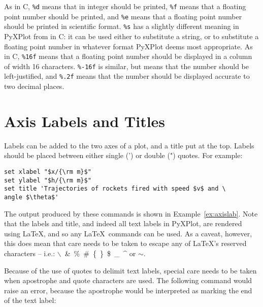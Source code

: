 As in C, {\tt \%d} means that in integer should be printed, {\tt \%f} means
that a floating point number should be printed, and {\tt \%e} means that a
floating point number should be printed in scientific format. {\tt \%s} has a
slightly different meaning in PyXPlot from in C: it can be used either to
substitute a string, or to substitute a floating point number in whatever
format PyXPlot deems most appropriate. As in C, {\tt \%16f} means that a
floating point number should be displayed in a column of width 16 characters.
{\tt \%-16f} is similar, but means that the number should be left-justified,
and {\tt \%.2f} means that the number should be displayed accurate to two
decimal places.

\section{Axis Labels and Titles}
\label{sec:latex_incompatibility}

Labels can be added to the two axes of a plot, and a title put at the top.
Labels should be placed between either single (') or double (") quotes.  For
example:

\begin{verbatim}
set xlabel "$x/{\rm m}$"
set ylabel "$h/{\rm m}$"
set title 'Trajectories of rockets fired with speed $v$ and \
angle $\theta$'
\end{verbatim}


\noindent The output produced by these commands is shown in
Example~\ref{ex:axislab}.  Note that the labels and title, and indeed all text
labels in PyXPlot, are rendered using \LaTeX, and so any \LaTeX\ commands can
be used.  As a caveat, however, this does mean that care needs to be taken to
escape any of \LaTeX's reserved characters -- i.e.:
$\backslash$~\&~\%~\#~\{~\}~\$~\_~\^{} or $\sim$.

Because of the use of quotes to delimit text labels, special care needs to be
taken when apostrophe and quote characters are used. The following command
would raise an error, because the apostrophe would be interpreted as marking
the end of the text label:

